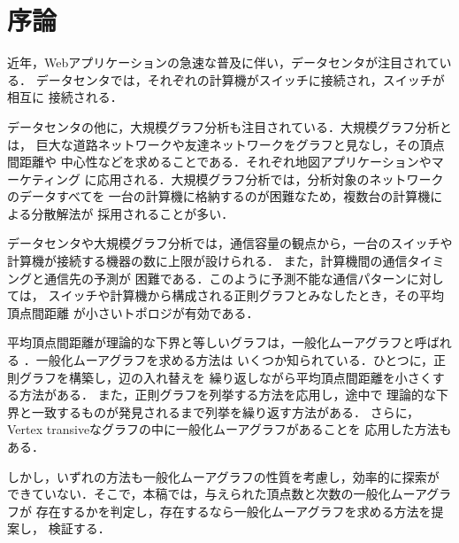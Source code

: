 
\chapter{序論}

近年，Webアプリケーションの急速な普及に伴い，データセンタが注目されている．
データセンタでは，それぞれの計算機がスイッチに接続され，スイッチが相互に
接続される．

データセンタの他に，大規模グラフ分析も注目されている．大規模グラフ分析とは，
巨大な道路ネットワークや友達ネットワークをグラフと見なし，その頂点間距離や
中心性などを求めることである．それぞれ地図アプリケーションやマーケティング
に応用される．大規模グラフ分析では，分析対象のネットワークのデータすべてを
一台の計算機に格納するのが困難なため，複数台の計算機による分散解法が
採用されることが多い．

データセンタや大規模グラフ分析では，通信容量の観点から，一台のスイッチや
計算機が接続する機器の数に上限が設けられる．
また，計算機間の通信タイミングと通信先の予測が
困難である．このように予測不能な通信パターンに対しては，
スイッチや計算機から構成される正則グラフとみなしたとき，その平均頂点間距離
が小さいトポロジが有効である\cite{Koibuchi2012,Singla2011}．

平均頂点間距離が理論的な下界と等しいグラフは，一般化ムーアグラフと呼ばれる
\cite{cerf1973computer,Cerf1974}．一般化ムーアグラフを求める方法は
いくつか知られている．ひとつに，正則グラフを構築し，辺の入れ替えを
繰り返しながら平均頂点間距離を小さくする方法\cite{Fujita2015}がある．
また，正則グラフを列挙する方法\cite{Sato2008}を応用し，途中で
理論的な下界と一致するものが発見されるまで列挙を繰り返す方法がある．
さらに，Vertex transiveなグラフの中に一般化ムーアグラフがあることを
応用した方法もある\cite{Sampels2004}．

しかし，いずれの方法も一般化ムーアグラフの性質を考慮し，効率的に探索が
できていない．そこで，本稿では，与えられた頂点数と次数の一般化ムーアグラフが
存在するかを判定し，存在するなら一般化ムーアグラフを求める方法を提案し，
検証する．
